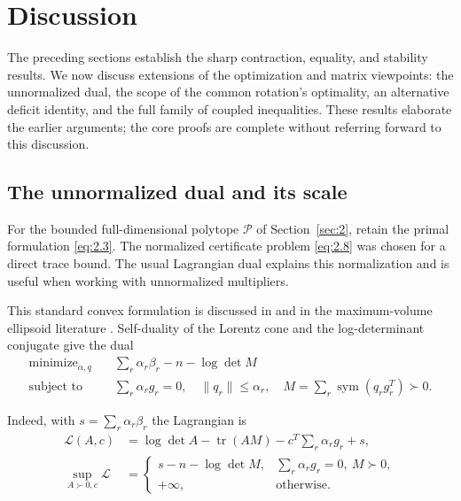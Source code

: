 \section{Discussion}\label{sec:10}

The preceding sections establish the sharp contraction, equality, and stability
results. We now discuss extensions of the optimization and matrix viewpoints:
the unnormalized dual, the scope of the common rotation's optimality, an
alternative deficit identity, and the full family of coupled inequalities.
These results elaborate the earlier arguments; the core proofs are complete
without referring forward to this discussion.

\subsection{The unnormalized dual and its scale}\label{sec:10.1}

For the bounded full-dimensional polytope $\mathcal P$ of Section~\ref{sec:2}, retain
the primal formulation \eqref{eq:2.3}. The normalized certificate problem \eqref{eq:2.8} was
chosen for a direct trace bound. The usual Lagrangian dual explains this
normalization and is useful when working with unnormalized multipliers.

This standard convex formulation is discussed in \cite[Section 8.4]{BV2004} and in the maximum-volume ellipsoid literature \cite{ZG2003}. Self-duality of the Lorentz cone and the log-determinant conjugate give the dual
\begin{equation}\label{eq:10.1}
\begin{aligned}
\text{minimize}_{\alpha,q}\quad&\sum_r\alpha_r\beta_r-n-\log\det M\\
\text{subject to}\quad&\sum_r\alpha_rg_r=0,\quad
\|q_r\|\le\alpha_r,\quad
M=\sum_r\operatorname{sym}(q_rg_r^T)\succ0.
\end{aligned}
\end{equation}

Indeed, with $s=\sum_r\alpha_r\beta_r$ the Lagrangian is
\begin{equation}\label{eq:10.2}
\begin{aligned}
\mathcal L(A,c)&=\log\det A-\operatorname{tr}(AM)
-c^T\sum_r\alpha_rg_r+s,\\
\sup_{A\succ0,c}\mathcal L&=
\begin{cases}
s-n-\log\det M,&\sum_r\alpha_rg_r=0,\ M\succ0,\\
+\infty,&\text{otherwise}.
\end{cases}
\end{aligned}
\end{equation}

